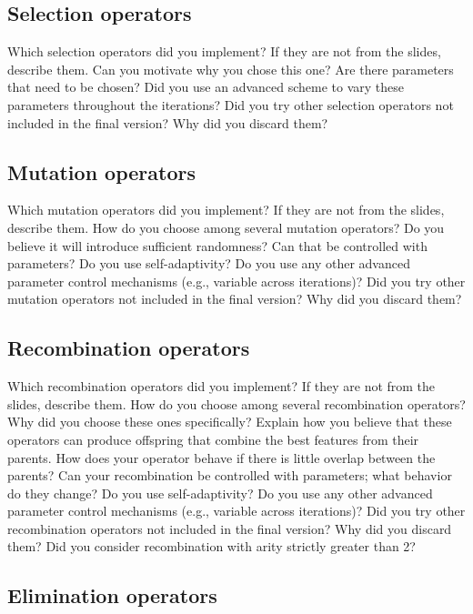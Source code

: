 \documentclass[a4paper,10pt]{article}
\newcommand{\ReplaceMe}[1]{{\color{blue}#1}}
\begin{document}
\subsection{Selection operators}\label{ssec:selection}

\ReplaceMe{Which selection operators did you implement? If they are not from the slides, describe them. Can you motivate why you chose this one? Are there parameters that need to be chosen? Did you use an advanced scheme to vary these parameters throughout the iterations? Did you try other selection operators not included in the final version? Why did you discard them?}

\subsection{Mutation operators}\label{ssec:mutation}

\ReplaceMe{Which mutation operators did you implement? If they are not from the slides, describe them. How do you choose among several mutation operators? Do you believe it will introduce sufficient randomness? Can that be controlled with parameters? Do you use self-adaptivity? Do you use any other advanced parameter control mechanisms (e.g., variable across iterations)? Did you try other mutation operators not included in the final version? Why did you discard them?}

\subsection{Recombination operators}\label{ssec:recombination}

\ReplaceMe{Which recombination operators did you implement? If they are not from the slides, describe them. How do you choose among several recombination operators? Why did you choose these ones specifically? Explain how you believe that these operators can produce offspring that combine the best features from their parents. How does your operator behave if there is little overlap between the parents? Can your recombination be controlled with parameters; what behavior do they change? Do you use self-adaptivity? Do you use any other advanced parameter control mechanisms (e.g., variable across iterations)? Did you try other recombination operators not included in the final version? Why did you discard them? Did you consider recombination with arity strictly greater than 2?}

\subsection{Elimination operators}\label{ssec:elimination}
\end{document}
